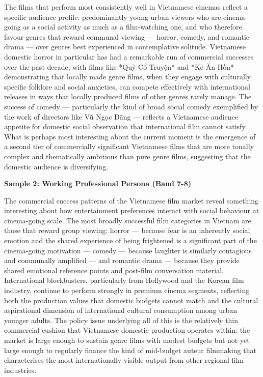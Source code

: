 The films that perform most consistently well in Vietnamese cinemas reflect a specific audience profile: predominantly young urban viewers who are cinema-going as a social activity as much as a film-watching one, and who therefore favour genres that reward communal viewing — horror, comedy, and romantic drama — over genres best experienced in contemplative solitude. Vietnamese domestic horror in particular has had a remarkable run of commercial successes over the past decade, with films like *Quỷ Cổ Truyện* and *Kẻ Ăn Hồn* demonstrating that locally made genre films, when they engage with culturally specific folklore and social anxieties, can compete effectively with international releases in ways that locally produced films of other genres rarely manage. The success of comedy — particularly the kind of broad social comedy exemplified by the work of directors like Vũ Ngọc Đãng — reflects a Vietnamese audience appetite for domestic social observation that international film cannot satisfy. What is perhaps most interesting about the current moment is the emergence of a second tier of commercially significant Vietnamese films that are more tonally complex and thematically ambitious than pure genre films, suggesting that the domestic audience is diversifying.

\textbf{Sample 2: Working Professional Persona (Band 7-8)}

The commercial success patterns of the Vietnamese film market reveal something interesting about how entertainment preferences interact with social behaviour at cinema-going scale. The most broadly successful film categories in Vietnam are those that reward group viewing: horror — because fear is an inherently social emotion and the shared experience of being frightened is a significant part of the cinema-going motivation — comedy — because laughter is similarly contagious and communally amplified — and romantic drama — because they provide shared emotional reference points and post-film conversation material. International blockbusters, particularly from Hollywood and the Korean film industry, continue to perform strongly in premium cinema segments, reflecting both the production values that domestic budgets cannot match and the cultural aspirational dimension of international cultural consumption among urban younger adults. The policy issue underlying all of this is the relatively thin commercial cushion that Vietnamese domestic production operates within: the market is large enough to sustain genre films with modest budgets but not yet large enough to regularly finance the kind of mid-budget auteur filmmaking that characterises the most internationally visible output from other regional film industries.

